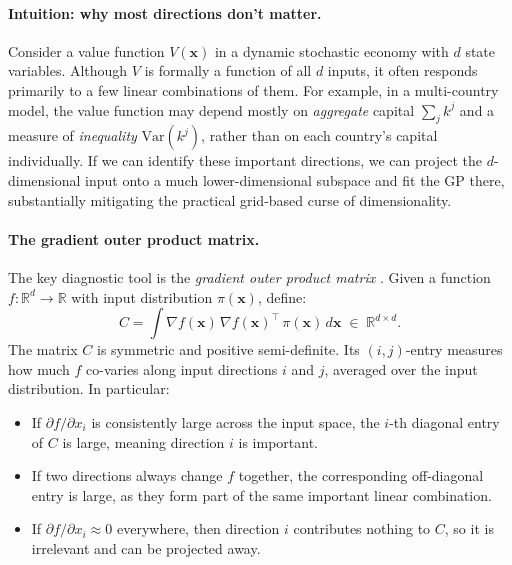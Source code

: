 \documentclass[11pt,a4paper]{report}
\newcommand{\x}{\bm{x}}
\newcommand{\R}{\mathbb{R}}
\begin{document}
\paragraph{Intuition: why most directions don't matter.}
Consider a value function $V(\x)$ in a dynamic stochastic economy with $d$ state variables.  Although $V$ is formally a function of all $d$ inputs, it often responds primarily to a few linear combinations of them.  For example, in a multi-country model, the value function may depend mostly on \emph{aggregate} capital $\sum_j k^j$ and a measure of \emph{inequality} $\mathrm{Var}(k^j)$, rather than on each country's capital individually.  If we can identify these important directions, we can project the $d$-dimensional input onto a much lower-dimensional subspace and fit the GP there, substantially mitigating the practical grid-based curse of dimensionality.

\paragraph{The gradient outer product matrix.}
The key diagnostic tool is the \emph{gradient outer product matrix} \citep[Ch.~1]{constantine2015active}.  Given a function $f\colon \R^d \to \R$ with input distribution $\pi(\x)$, define:
\begin{equation}
C = \int \nabla f(\x) \, \nabla f(\x)^\top \, \pi(\x)\, d\x \;\in\; \R^{d \times d}.
\label{eq:active_subspace}
\end{equation}
The matrix $C$ is symmetric and positive semi-definite.  Its $(i,j)$-entry measures how much $f$ co-varies along input directions $i$ and $j$, averaged over the input distribution.  In particular:
\begin{itemize}[itemsep=2pt]
\item If $\partial f / \partial x_i$ is consistently large across the input space, the $i$-th diagonal entry of $C$ is large, meaning direction $i$ is important.
\item If two directions always change $f$ together, the corresponding off-diagonal entry is large, as they form part of the same important linear combination.
\item If $\partial f / \partial x_i \approx 0$ everywhere, then direction $i$ contributes nothing to $C$, so it is irrelevant and can be projected away.
\end{itemize}
\end{document}
